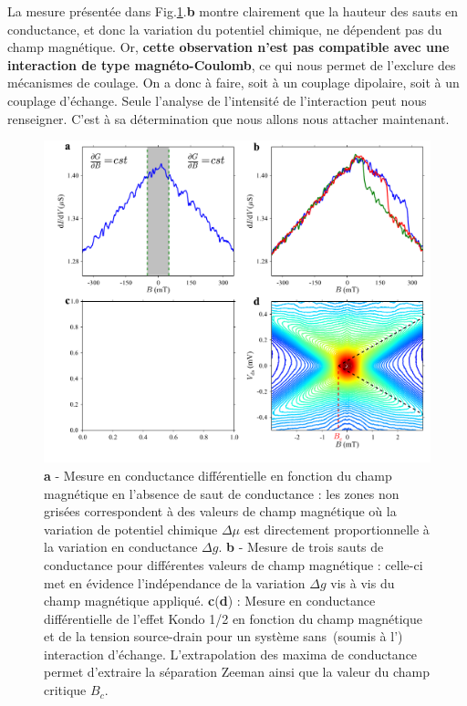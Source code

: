 La mesure présentée dans Fig.\ref{analyse_interaction}.\textbf{b} montre clairement que la hauteur des sauts en conductance, et donc la variation du potentiel chimique, ne dépendent pas du champ magnétique. Or, \textbf{cette observation n'est pas compatible avec une interaction de type magnéto-Coulomb}, ce qui nous permet de l'exclure des mécanismes de coulage. On a donc à faire, soit à un couplage dipolaire, soit à un couplage d'échange. Seule l'analyse de l'intensité de l'interaction peut nous renseigner. C'est à sa détermination que nous allons nous attacher maintenant.

\begin{figure}
\includegraphics[scale=0.45]{Resultats/AmplJump/AmplJump.pdf} 
\caption{\textbf{a} - Mesure en conductance différentielle en fonction du champ magnétique en l'absence de saut de conductance : les zones non grisées correspondent à des valeurs de champ magnétique où la variation de potentiel chimique $\Delta \mu$ est directement proportionnelle à la variation en conductance $\Delta g$. \textbf{b} - Mesure de trois sauts de conductance pour différentes valeurs de champ magnétique : celle-ci met en évidence l'indépendance de la variation $\Delta g$ vis à vis du champ magnétique appliqué. \textbf{c}(\textbf{d}) : Mesure en conductance différentielle de l'effet Kondo 1/2 en fonction du champ magnétique et de la tension source-drain pour un système sans~(soumis à l') interaction d'échange. L'extrapolation des maxima de conductance permet d'extraire la séparation Zeeman ainsi que la valeur du champ critique $B_c$.}
\label{analyse_interaction}
\end{figure}

